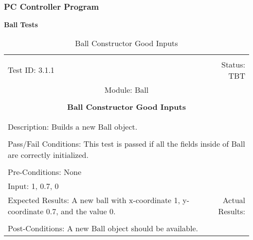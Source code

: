 \documentclass[titlepage]{article}
\begin{document}
\subsubsection{PC Controller Program}
\large{\textbf{Ball Tests}}
\begin{center}%
\begin{table}
\begin{tabular}{|l r|}\hline&\\[-2mm]
	Test ID: 3.1.1	&Status: TBT\\[-3mm]
	\multicolumn{2}{|c|}{Module: Ball}\\&\\
	\multicolumn{2}{|c|}{\textbf{\large{Ball Constructor Good Inputs}}}\\&\\\hline&\\[-3mm]
	\multicolumn{2}{|p{\textwidth}|}{Description: Builds a new Ball object.}\\[1mm]\hline&\\[-3mm]
	\multicolumn{2}{|p{\textwidth}|}{Pass/Fail Conditions: This test is passed if all the fields inside of Ball are correctly initialized.}\\[1mm]\hline&\\[-3mm]
	\multicolumn{2}{|p{\textwidth}|}{Pre-Conditions: None}\\[4mm]
	\multicolumn{2}{|p{\textwidth}|}{Input: 1, 0.7, 0}\\[2mm]\hline
	\multicolumn{1}{|p{0.49\textwidth}}{Expected Results: A new ball with x-coordinate 1, y-coordinate 0.7, and the value 0.}	&\multicolumn{1}{|p{0.45\textwidth}|}{Actual Results:}\\\hline&\\[-3mm]
	\multicolumn{2}{|p{\textwidth}|}{Post-Conditions: A new Ball object should be available.}\\\hline
\end{tabular}
\caption{Ball Constructor Good Inputs}
\end{table}
\end{center}
\end{document}
